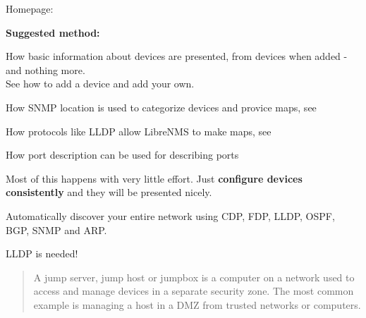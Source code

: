 \documentclass[Screen16to9,17pt]{foils}
\begin{document}
\begin{list2}
\item Homepage: 
\item {\bf Suggested method:}
\item How basic information about devices are presented, from devices when added - and nothing more.\\
See how to add a device and add your own. 
\item How SNMP location is used to categorize devices and provice maps, see\\
\item How protocols like LLDP allow LibreNMS to make maps, see\\
\item How port description can be used for describing ports\\
\end{list2}

Most of this happens with very little effort. Just {\bf configure devices consistently} and they will be presented nicely.





Automatically discover your entire network using CDP, FDP, LLDP,
OSPF, BGP, SNMP and ARP.



\centerline{LLDP is needed!}





\begin{quote}
A jump server, jump host or jumpbox is a computer on a network used to access and manage devices in a separate security zone. The most common example is managing a host in a DMZ from trusted networks or computers.
\end{quote}
\end{document}
